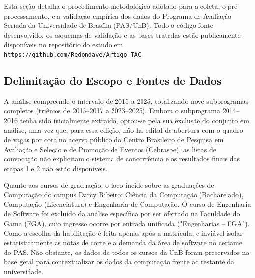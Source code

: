\documentclass[12pt]{article}
\begin{document}
Esta seção detalha o procedimento metodológico adotado para a coleta, o pré-processamento, e a validação empírica dos dados do Programa de Avaliação Seriada da Universidade de Brasília (PAS/UnB). Todo o código-fonte desenvolvido, os esquemas de validação e as bases tratadas estão publicamente disponíveis no repositório do estudo em \texttt{https://github.com/Redondave/Artigo-TAC}.

\subsection{Delimitação do Escopo e Fontes de Dados}

A análise compreende o intervalo de 2015 a 2025, totalizando nove subprogramas completos (triênios de 2015--2017 a 2023--2025). Embora o subprograma 2014--2016 tenha sido inicialmente extraído, optou-se pela sua exclusão do conjunto em análise, uma vez que, para essa edição, não há edital de abertura com o quadro de vagas por cota no acervo público do Centro Brasileiro de Pesquisa em Avaliação e Seleção e de Promoção de Eventos (Cebraspe), as listas de convocação não explicitam o sistema de concorrência e os resultados finais das etapas 1 e 2 não estão disponíveis.

Quanto aos cursos de graduação, o foco incide sobre as graduações de Computação do campus Darcy Ribeiro: Ciência da Computação (Bacharelado), Computação (Licenciatura) e Engenharia de Computação. O curso de Engenharia de Software foi excluído da análise específica por ser ofertado na Faculdade do Gama (FGA), cujo ingresso ocorre por entrada unificada ("Engenharias – FGA"). Como a escolha da habilitação é feita apenas após a matrícula, é inviável isolar estatisticamente as notas de corte e a demanda da área de software no certame do PAS. Não obstante, os dados de todos os cursos da UnB foram preservados na base geral para contextualizar os dados da computação frente ao restante da universidade.
\end{document}
